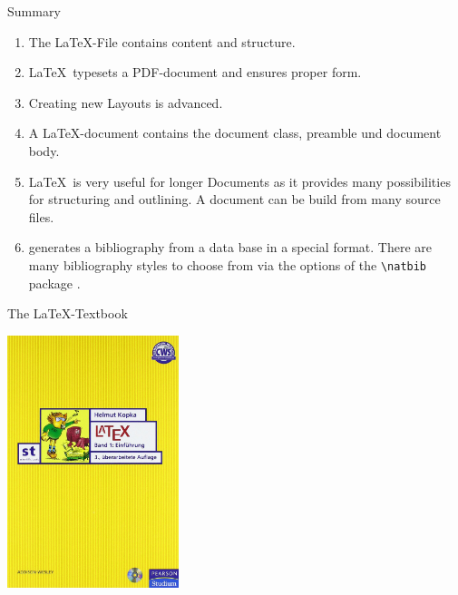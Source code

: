
\begin{frame}[fragile]{Summary}
  \begin{enumerate}
    \item The \alert{\LaTeX-File} contains \alert{content and structure}.
    \item \LaTeX\ typesets a \alert{PDF-document} and ensures proper \alert{form}.
    \item Creating {new Layouts} is advanced.
    \item A \LaTeX-document contains the \alert{document class}, \alert{preamble} und \alert{document body}.
    \item \LaTeX\ is very useful for \alert{longer Documents} as it provides many possibilities for \alert{structuring} and
      \alert{outlining}. A document can be build from
      \alert{many source files}.
    \item \alert{\BibTeX} generates a \alert{bibliography} from a \alert{data base} in a special format. There are many \alert{bibliography styles} to choose from via the options of the \lstinline-\natbib- package \lstinline--.
  \end{enumerate}
\end{frame}

\begin{frame}{The \LaTeX-Textbook}
  \begin{center}
    \includegraphics[width=5cm]{buecher/kopka}
  \end{center}
\end{frame}


